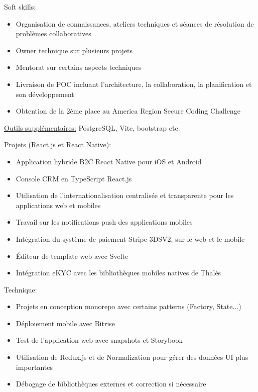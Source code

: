 \documentclass[10.5pt,a4paper,ragged2e,withhyper]{altacv}
\begin{document}
\medskip
Soft skills:
\begin{itemize}
  \item Organisation de connaissances, ateliers techniques et séances de résolution de problèmes collaboratives
  \item Owner technique sur plusieurs projets
  \item Mentorat sur certains aspects techniques
  \item Livraison de POC incluant l'architecture, la collaboration, la planification et son développement
  \item Obtention de la 2ème place au America Region Secure Coding Challenge
\end{itemize}
\begin{itshape}
  \underline{Outils supplémentaires:}
  \small{PostgreSQL, Vite, bootstrap etc.}
\end{itshape}

\divider

\vspace{-.5\baselineskip}
\begin{minipage}[t]{0.45\textwidth}
  \vspace{0pt}
  Projets (React.js et React Native):
  \begin{itemize}
    \item Application hybride B2C React Native pour iOS et Android
    \item Console CRM en TypeScript React.js
    \item Utilisation de l'internationalisation centralisée et transparente pour les applications web et mobiles
    \item Travail sur les notifications push des applications mobiles
    \item Intégration du système de paiement Stripe 3DSV2, sur le web et le mobile
    \item Éditeur de template web avec Svelte
    \item Intégration eKYC avec les bibliothèques mobiles natives de Thalès
  \end{itemize}
\end{minipage}
\hfill
\begin{minipage}[t]{0.45\textwidth}
  \vspace{0pt}
  Technique:
  \begin{itemize}
    \item Projets en conception monorepo avec certains patterns (Factory, State...)
    \item Déploiement mobile avec Bitrise
    \item Test de l'application web avec snapshots et Storybook
    \item Utilisation de Redux.js et de Normalization pour gérer des données UI plus importantes
    \item Débogage de bibliothèques externes et correction si nécessaire
  \end{itemize}
\end{minipage}
\end{document}
